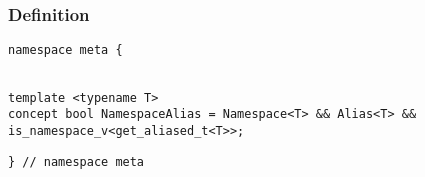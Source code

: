
\subsubsection{Definition}

\begin{verbatim}
namespace meta {
\end{verbatim}
\begin{verbatim}

template <typename T>
concept bool NamespaceAlias = Namespace<T> && Alias<T> && is_namespace_v<get_aliased_t<T>>;

\end{verbatim}
\begin{verbatim}
} // namespace meta
\end{verbatim}
